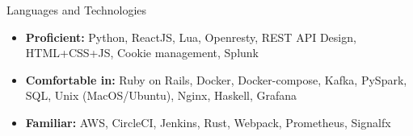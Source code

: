 \documentclass[]{mcdowellcv}
\begin{document}
	\begin{cvsection}{Languages and Technologies}
		\begin{cvsubsection}{}{}{}	
			\begin{itemize}
				\item \textbf{Proficient:} Python, ReactJS, Lua, Openresty, REST API Design, HTML+CSS+JS, Cookie management, Splunk
				\item \textbf{Comfortable in:} Ruby on Rails, Docker, Docker-compose, Kafka, PySpark, SQL, Unix (MacOS/Ubuntu), Nginx, Haskell, Grafana
				\item \textbf{Familiar:} AWS, CircleCI, Jenkins, Rust, Webpack, Prometheus, Signalfx
			\end{itemize}
		\end{cvsubsection}
	\end{cvsection}
	
\end{document}
